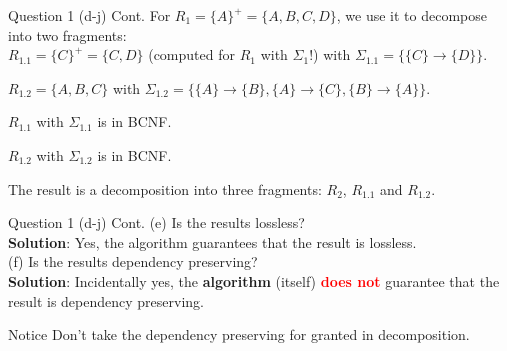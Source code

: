 \begin{frame}[fragile]{Question 1 (d-j) Cont.}
	For $R_1 = \{A\}^{+} = \{A, B, C, D\}$, we use it to decompose into two fragments:\\\vspace{5pt}
	$R_{1.1} = \{C\}^{+} = \{C, D\}$ (computed for $R_1$ with $\Sigma_1$!) with $\Sigma_{1.1} = \{\{C\} \rightarrow \{D\}\}$.
	
	$R_{1.2} = \{A, B, C\}$ with $\Sigma_{1.2} = \{\{A\} \rightarrow \{B\}, \{A\} \rightarrow \{C\}, \{B\} \rightarrow \{A\}\}$.\\\vspace{5pt}
	
	$R_{1.1}$ with $\Sigma_{1.1}$ is in BCNF.
	
	$R_{1.2}$ with $\Sigma_{1.2}$ is in BCNF.\\\vspace{5pt}
	
	The result is a decomposition into three fragments: $R_2$, $R_{1.1}$ and $R_{1.2}$.\\\vspace{5pt}
\end{frame}

\begin{frame}[fragile]{Question 1 (d-j) Cont.}
	(e) Is the results lossless?\\\vspace{5pt}
	\textbf{Solution}: Yes, the algorithm guarantees that the result is lossless.\\
	\vspace{30pt}
	(f) Is the results dependency preserving?\\\vspace{5pt}
	\textbf{Solution}:
	Incidentally yes, the \textbf{algorithm} (itself) \textcolor{red}{\textbf{does not}} guarantee that the result is dependency preserving.\\
	\begin{alertblock}{Notice}
		Don't take the dependency preserving for granted in decomposition.
	\end{alertblock}
	
\end{frame}


